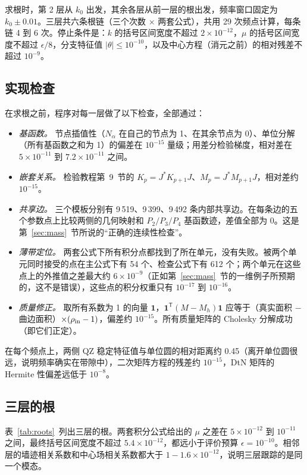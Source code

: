 \documentclass[11pt,a4paper,fontset=fandol]{ctexart}
\begin{document}
求根时，第 2 层从 $k_0$ 出发，其余各层从前一层的根出发，频率窗口固定为 $k_0\pm0.01$。三层共六条根链（三个次数 $\times$ 两套公式），共用 29 次频点计算，每条链 4 到 6 次。停止条件是：$k$ 的括号区间宽度不超过 $2\times10^{-12}$，$\mu$ 的括号区间宽度不超过 $\epsilon/8$，分支特征值 $|\theta|\le10^{-10}$，以及中心方程（消元之前）的相对残差不超过 $10^{-9}$。

\subsection{实现检查}

在求根之前，程序对每一层做了以下检查，全部通过：
\begin{itemize}
\item \emph{基函数。} 节点插值性（$N_\alpha$ 在自己的节点为 1、在其余节点为 0）、单位分解（所有基函数之和为 1）的偏差在 $10^{-15}$ 量级；用差分检验梯度，相对差在 $5\times10^{-11}$ 到 $7.2\times10^{-11}$ 之间。
\item \emph{嵌套关系。} 检验教程第~9~节的 $K_p=J^*K_{p+1}J$、$M_p=J^*M_{p+1}J$，相对差约 $10^{-15}$。
\item \emph{共享边。} 三个模板分别有 9\,519、9\,399、9\,492 条内部共享边。在每条边的五个参数点上比较两侧的几何映射和 $P_2/P_3/P_4$ 基函数迹，差值全部为 0。这是第~\ref{sec:mass}~节所说的“正确的连续性检查”。
\item \emph{薄带定位。} 两套公式下所有积分点都找到了所在单元，没有失败。被两个单元同时接受的点在主公式下有 54 个、检查公式下有 612 个；两个单元在这些点上的外推值之差最大约 $6\times10^{-9}$（正如第~\ref{sec:mass}~节的一维例子所预期的，这不是错误），这些点的积分权重只有 $10^{-17}$ 到 $10^{-16}$。
\item \emph{质量修正。} 取所有系数为 1 的向量 $\bm 1$，$\bm 1^{\mathsf T}(M-M_h)\bm 1$ 应等于（真实面积 $-$ 曲边面积）$\times(\rho_{\rm in}-1)$，偏差约 $10^{-15}$。所有质量矩阵的 Cholesky 分解成功（即它们正定）。
\end{itemize}
在每个频点上，两侧 QZ 稳定特征值与单位圆的相对距离约 0.45（离开单位圆很远，说明频率确实在带隙中），二次矩阵方程的残差约 $10^{-15}$，DtN 矩阵的 Hermite 性偏差远低于 $10^{-8}$。

\subsection{三层的根}

表~\ref{tab:roots}~列出三层的根。两套积分公式给出的 $\mu$ 之差在 $5\times10^{-12}$ 到 $10^{-11}$ 之间，最终括号区间宽度不超过 $5.4\times10^{-12}$，都远小于评价预算 $\epsilon=10^{-10}$。相邻层的墙迹相关系数和中心场相关系数都大于 $1-1.6\times10^{-12}$，说明三层跟踪的是同一个模态。
\end{document}
